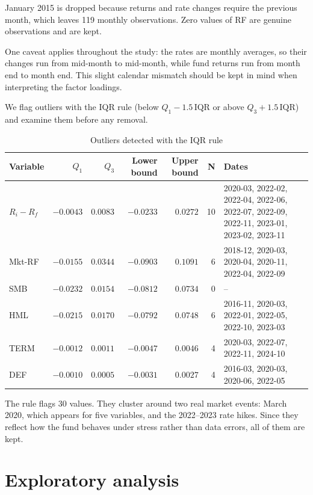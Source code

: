 \documentclass[11pt,a4paper]{article}
\begin{document}
January 2015 is dropped because returns and rate changes require the previous month, which leaves 119 monthly observations. Zero values of RF are genuine observations and are kept.

One caveat applies throughout the study: the rates are monthly averages, so their changes run from mid-month to mid-month, while fund returns run from month end to month end. This slight calendar mismatch should be kept in mind when interpreting the factor loadings.

We flag outliers with the IQR rule (below $Q_1 - 1.5\,\text{IQR}$ or above $Q_3 + 1.5\,\text{IQR}$) and examine them before any removal.

\begin{table}[H]
\centering
\caption{Outliers detected with the IQR rule}
\footnotesize
\setlength{\tabcolsep}{4pt}
\begin{tabular}{lrrrrrp{4.4cm}}
\toprule
Variable & $Q_1$ & $Q_3$ & Lower bound & Upper bound & N & Dates \\
\midrule
$R_i - R_f$ & $-0.0043$ & $0.0083$ & $-0.0233$ & $0.0272$ & 10 & 2020-03, 2022-02, 2022-04, 2022-06, 2022-07, 2022-09, 2022-11, 2023-01, 2023-02, 2023-11 \\
Mkt-RF & $-0.0155$ & $0.0344$ & $-0.0903$ & $0.1091$ & 6 & 2018-12, 2020-03, 2020-04, 2020-11, 2022-04, 2022-09 \\
SMB & $-0.0232$ & $0.0154$ & $-0.0812$ & $0.0734$ & 0 & -- \\
HML & $-0.0215$ & $0.0170$ & $-0.0792$ & $0.0748$ & 6 & 2016-11, 2020-03, 2022-01, 2022-05, 2022-10, 2023-03 \\
TERM & $-0.0012$ & $0.0011$ & $-0.0047$ & $0.0046$ & 4 & 2020-03, 2022-07, 2022-11, 2024-10 \\
DEF & $-0.0010$ & $0.0005$ & $-0.0031$ & $0.0027$ & 4 & 2016-03, 2020-03, 2020-06, 2022-05 \\
\bottomrule
\end{tabular}
\end{table}

The rule flags 30 values. They cluster around two real market events: March 2020, which appears for five variables, and the 2022--2023 rate hikes. Since they reflect how the fund behaves under stress rather than data errors, all of them are kept.

\section{Exploratory analysis}
\end{document}
